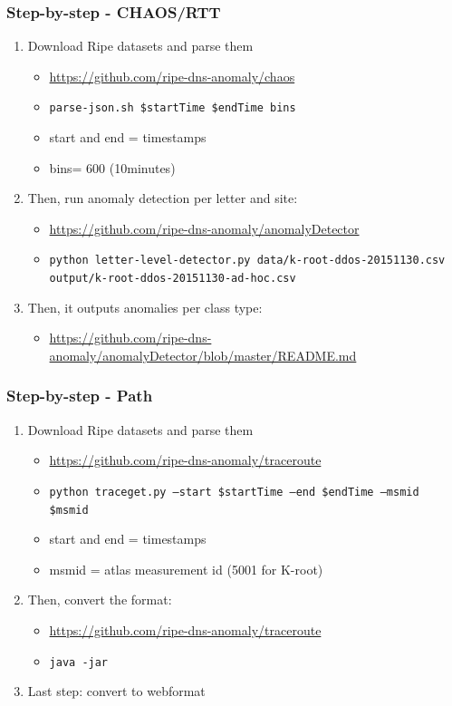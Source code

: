 \documentclass[serif]{beamer}
\begin{document}
\begin{frame}[fragile]
	\frametitle{Step-by-step - CHAOS/RTT}
	
\begin{enumerate}
 \item Download Ripe datasets and parse them
 \begin{itemize}
  \item \url{https://github.com/ripe-dns-anomaly/chaos }
  \item \texttt{parse-json.sh \$startTime \$endTime bins}
  \item start and end = timestamps
  \item bins= 600 (10minutes)
 \end{itemize}

 \item Then, run anomaly detection per letter and site:
 \begin{itemize}
  \item \url{https://github.com/ripe-dns-anomaly/anomalyDetector}
  \item \texttt{python letter-level-detector.py data/k-root-ddos-20151130.csv 
output/k-root-ddos-20151130-ad-hoc.csv}
 \end{itemize}

\item Then, it outputs anomalies per class type:
\begin{itemize}
 \item 
\url{https://github.com/ripe-dns-anomaly/anomalyDetector/blob/master/README.md}
\end{itemize}

\end{enumerate}


\end{frame}

\begin{frame}[fragile]
	\frametitle{Step-by-step - Path}
	
\begin{enumerate}
 \item Download Ripe datasets and parse them
 \begin{itemize}
  \item \url{https://github.com/ripe-dns-anomaly/traceroute }
  \item \texttt{python traceget.py --start \$startTime --end \$endTime --msmid \$msmid}
  \item start and end = timestamps
  \item msmid = atlas measurement id (5001 for K-root)
 \end{itemize}

 \item Then, convert the format:
 \begin{itemize}
  \item \url{https://github.com/ripe-dns-anomaly/traceroute}
  \item \texttt{java -jar}
 \end{itemize}

 \item Last step: convert to webformat
\end{enumerate}

\end{frame}
\end{document}
